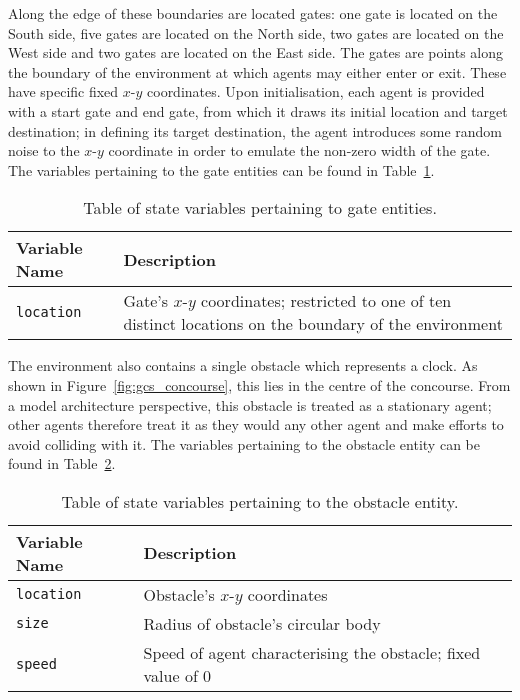 Along the edge of these boundaries are located gates: one gate is located on the
South side, five gates are located on the North side, two gates are located on
the West side and two gates are located on the East side.
The gates are points along the boundary of the environment at which agents may
either enter or exit.
These have specific fixed $x$-$y$ coordinates.
Upon initialisation, each agent is provided with a start gate and end gate, from
which it draws its initial location and target destination; in defining its
target destination, the agent introduces some random noise to the $x$-$y$
coordinate in order to emulate the non-zero width of the gate.
The variables pertaining to the gate entities can be found in
Table~\ref{tab:gate_variables}.

\begin{table}
    \centering
    \begin{tabularx}{\textwidth}{lX}
        \toprule
        Variable Name & Description \\
        \midrule
        \texttt{location} & Gate's $x$-$y$ coordinates; restricted to one of ten
                            distinct locations on the boundary of the
                            environment \\
        \bottomrule
    \end{tabularx}
    \caption{Table of state variables pertaining to gate
    entities.}\label{tab:gate_variables}
\end{table}

The environment also contains a single obstacle which represents a clock.
As shown in Figure~\ref{fig:gcs_concourse}, this lies in the centre of the
concourse.
From a model architecture perspective, this obstacle is treated as a stationary
agent; other agents therefore treat it as they would any other agent and make
efforts to avoid colliding with it.
The variables pertaining to the obstacle entity can be found in
Table~\ref{tab:obstacle_variables}.

\begin{table}
    \centering
    \begin{tabularx}{\textwidth}{lX}
        \toprule
        Variable Name & Description \\
        \midrule
        \texttt{location} & Obstacle's $x$-$y$ coordinates \\
        \texttt{size} & Radius of obstacle's circular body \\
        \texttt{speed} & Speed of agent characterising the obstacle; fixed value
                         of 0 \\
        \bottomrule
    \end{tabularx}
    \caption{Table of state variables pertaining to the obstacle
    entity.}\label{tab:obstacle_variables}
\end{table}

